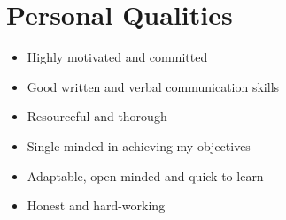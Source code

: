 \section*{Personal Qualities}

\begin{itemize}
	\item Highly motivated and committed
	\item Good written and verbal communication skills
	\item Resourceful and thorough
	\item Single-minded in achieving my objectives
	\item Adaptable, open-minded and quick to learn
	\item Honest and hard-working
\end{itemize}
